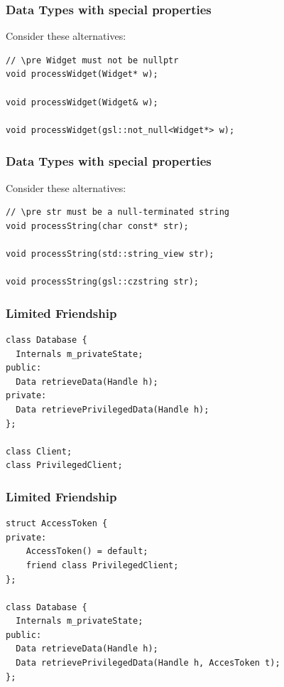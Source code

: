 \documentclass[aspectratio=169]{beamer}
\begin{document}
\begin{frame}[fragile]
  \frametitle{Data Types with special properties}

Consider these alternatives:

  \begin{lstlisting}[style=cpp20]
// \pre Widget must not be nullptr
void processWidget(Widget* w);

void processWidget(Widget& w);

void processWidget(gsl::not_null<Widget*> w);
  \end{lstlisting}
\end{frame}

\begin{frame}[fragile]
  \frametitle{Data Types with special properties}

Consider these alternatives:
  \begin{lstlisting}[style=cpp20]
// \pre str must be a null-terminated string
void processString(char const* str);

void processString(std::string_view str);

void processString(gsl::czstring str);
  \end{lstlisting}
\end{frame}

\begin{frame}[fragile]
  \frametitle{Limited Friendship}
  
  \begin{lstlisting}[style=cpp20]
class Database {
  Internals m_privateState;
public:
  Data retrieveData(Handle h);
private:
  Data retrievePrivilegedData(Handle h);
};

class Client;
class PrivilegedClient;
  \end{lstlisting}
\end{frame}

\begin{frame}[fragile]
  \frametitle{Limited Friendship}
  
  \begin{lstlisting}[style=cpp20]
struct AccessToken {
private:
    AccessToken() = default;
    friend class PrivilegedClient;
};

class Database {
  Internals m_privateState;
public:
  Data retrieveData(Handle h);
  Data retrievePrivilegedData(Handle h, AccesToken t);
};
  \end{lstlisting}
\end{frame}
\end{document}
